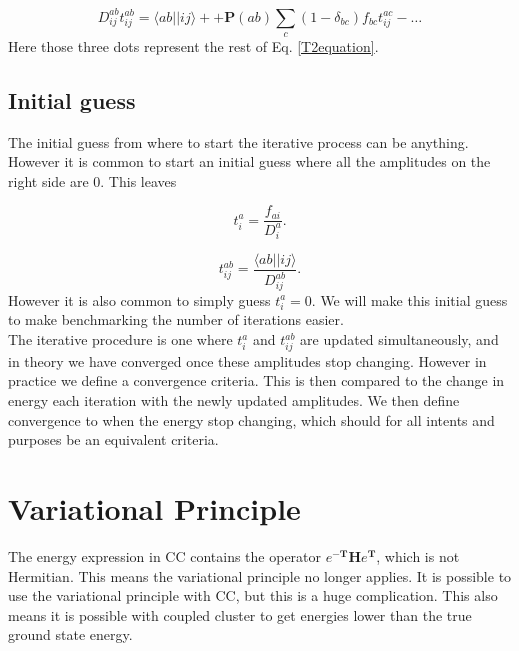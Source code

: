 \begin{equation}
D_{ij}^{ab} t_{ij}^{ab} = \langle ab||ij \rangle + + 
\textbf{P}(ab) \sum_c (1-\delta_{bc}) f_{bc} t_{ij}^{ac} - \dots \nonumber
\end{equation}
Here those three dots represent the rest of Eq. \eqref{T2equation}.

\subsection{Initial guess}
The initial guess from where to start the iterative process can be anything. However it is common to start an initial guess where all the amplitudes on the right side are 0. This leaves

\begin{equation}
t_i^a = \frac{f_{ai}}{D_i^a} .
\end{equation}

\begin{equation}
t_{ij}^{ab} = \frac{\langle ab || ij \rangle}{D_{ij}^{ab}} .
\end{equation}
However it is also common to simply guess $t_i^a = 0$. We will make this initial guess to make benchmarking the number of iterations easier. \\

The iterative procedure is one where $t_i^a$ and $t_{ij}^{ab}$ are updated simultaneously, and in theory we have converged once these amplitudes stop changing. However in practice we define a convergence criteria. This is then compared to the change in energy each iteration with the newly updated amplitudes. We then define convergence to when the energy stop changing, which should for all intents and purposes be an equivalent criteria. 

\section{Variational Principle}
The energy expression in CC contains the operator $e^{-\textbf{T}} \textbf{H} e^{\textbf{T}}$, which is not Hermitian. This means the variational principle no longer applies. It is possible to use the variational principle with CC, but this is a huge complication. This also means it is possible with coupled cluster to get energies lower than the true ground state energy.

